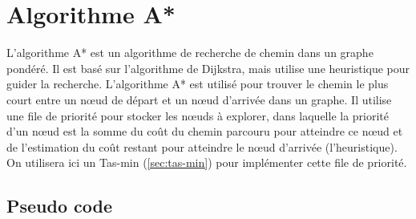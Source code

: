 \section{Algorithme A*}
\label{sec:a-star}

L'algorithme A* est un algorithme de recherche de chemin dans un graphe pondéré.
Il est basé sur l'algorithme de Dijkstra, mais utilise une heuristique pour guider la recherche.
L'algorithme A* est utilisé pour trouver le chemin le plus court entre un nœud de départ et un nœud d'arrivée dans un graphe.
\newline
Il utilise une file de priorité pour stocker les nœuds à explorer, dans laquelle la priorité d'un nœud est la somme du coût du chemin parcouru pour atteindre ce nœud et de l'estimation du coût restant pour atteindre le nœud d'arrivée (l'heuristique). 
On utilisera ici un Tas-min (\autoref{sec:tas-min}) pour implémenter cette file de priorité.

\subsection{Pseudo code}

